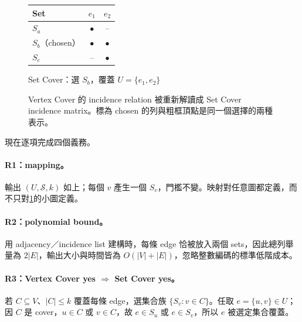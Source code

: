 \documentclass[11pt,a4paper,oneside,openany]{book}
\begin{document}
\begin{figure}[htbp]
\centering
\begin{minipage}[c]{.38\textwidth}
\centering
{}
\end{minipage}\hfill
\begin{minipage}[c]{.57\textwidth}
\centering\small
\begin{tabular}{@{}lcc@{}}
\toprule
Set & $e_1$ & $e_2$ \\
\midrule
$S_a$ & $\bullet$ & -- \\
$S_b$（chosen） & $\bullet$ & $\bullet$ \\
$S_c$ & -- & $\bullet$ \\
\bottomrule
\end{tabular}

\medskip
Set Cover：選 $S_b$，覆蓋 $U=\{e_1,e_2\}$
\end{minipage}
\caption{Vertex Cover 的 incidence relation 被重新解讀成 Set Cover incidence matrix。標為 chosen 的列與粗框頂點是同一個選擇的兩種表示。}
\label{fig:vc-to-sc-concrete}
\end{figure}

現在逐項完成四個義務。

\paragraph{R1：mapping。}
輸出 $(U,\mathcal S,k)$ 如上；每個 $v$ 產生一個 $S_v$，門檻不變。映射對任意圖都定義，而不只對\cref{fig:vc-to-sc-concrete}的小圖定義。

\paragraph{R2：polynomial bound。}
用 adjacency／incidence list 建構時，每條 edge 恰被放入兩個 sets，因此總列舉量為 $2|E|$，輸出大小與時間皆為 $O(|V|+|E|)$，忽略整數編碼的標準低階成本。

\paragraph{R3：Vertex Cover yes $\Rightarrow$ Set Cover yes。}
若 $C\subseteq V$、$|C|\le k$ 覆蓋每條 edge，選集合族 $\{S_v:v\in C\}$。任取 $e=\{u,v\}\in U$；因 $C$ 是 cover，$u\in C$ 或 $v\in C$，故 $e\in S_u$ 或 $e\in S_v$，所以 $e$ 被選定集合覆蓋。
\end{document}
